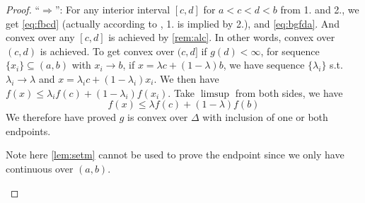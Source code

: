 \documentclass{article}
\begin{document}
\begin{proof}
``$\Rightarrow$'':
For any interior interval $[c,d]$ for  $a<c<d<b$ from 1. and 2., we get \cref{eq:fbcd} (actually  according to \cite[Theorem 5.4.3]{mtnotes}, 1. is implied by 2.), and \cref{eq:bgfda}. And convex over any $[c,d]$ is achieved by \cref{rem:alc}. In other words, convex over $(c,d)$ is achieved. To get convex over $(c,d]$ if $g(d)<\infty$, for sequence $\{x_i\}\subseteq (a,b)$ with $x_i\to b$, if $x=\lambda c +(1-\lambda)b$, we have sequence $\{\lambda_i\}$ s.t. $\lambda_i\to \lambda$ and $x=\lambda_i c+(1-\lambda_i)x_i$. We then have $f(x)\le \lambda_i f(c)+(1-\lambda_i)f(x_i)$. Take $\limsup$ from both sides, we have 
$$f(x)\le  \lambda f(c)+(1-\lambda)f(b)$$
We therefore have proved $g$ is convex over $\Delta$ with inclusion of one or both endpoints.
\begin{rema}
Note here \cref{lem:setm} cannot be used to prove the endpoint since we only have continuous over $(a,b)$.
\end{rema}
\end{proof}
\end{document}
